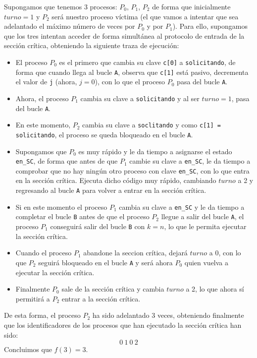 \begin{description}
        Supongamos que tenemos 3 procesos: $P_0$, $P_1$, $P_2$ de forma que inicialmente $turno = 1$ y $P_2$ será nuestro proceso víctima (el que vamos a intentar que sea adelantado el máximo número de veces por $P_0$ y por $P_1$). Para ello, supongamos que los tres intentan acceder de forma simultánea al protocolo de entrada de la sección crítica, obteniendo la siguiente traza de ejecución:
        \begin{itemize}
            \item El proceso $P_0$ es el primero que cambia su clave \verb|c[0]| a \verb|solicitando|, de forma que cuando llega al bucle \verb|A|, observa que \verb|c[1]| está pasivo, decrementa el valor de \verb|j| (ahora, $j=0$), con lo que el proceso $P_0$ pasa del bucle \verb|A|.
            \item Ahora, el proceso $P_1$ cambia su clave a \verb|solicitando| y al ser $turno = 1$, pasa del bucle \verb|A|.
            \item En este momento, $P_2$ cambia su clave a \verb|soclitando| y como \newline \verb|c[1] = solicitando|, el proceso se queda bloqueado en el bucle \verb|A|.
            \item Supongamos que $P_0$ es muy rápido y le da tiempo a asignarse el estado \verb|en_SC|, de forma que antes de que $P_1$ cambie su clave a \verb|en_SC|, le da tiempo a comprobar que no hay ningún otro proceso con clave \verb|en_SC|, con lo que entra en la sección crítica. Ejecuta dicho código muy rápido, cambiando $turno$ a 2 y regresando al bucle \verb|A| para volver a entrar en la sección crítica.
            \item Si en este momento el proceso $P_1$ cambia su clave a \verb|en_SC| y le da tiempo a completar el bucle \verb|B| antes de que el proceso $P_2$ llegue a salir del bucle \verb|A|, el proceso $P_1$ conseguirá salir del bucle \verb|B| con $k = n$, lo que le permita ejecutar la sección crítica.
            \item Cuando el proceso $P_1$ abandone la seccion crítica, dejará $turno$ a 0, con lo que $P_2$ seguirá bloqueado en el bucle \verb|A| y será ahora $P_0$ quien vuelva a ejecutar la sección crítica.
            \item Finalmente $P_0$ sale de la sección crítica y cambia $turno$ a 2, lo que ahora sí permitirá a $P_2$ entrar a la sección crítica.
        \end{itemize}
        De esta forma, el proceso $P_2$ ha sido adelantado 3 veces, obteniendo finalmente que los identificadores de los procesos que han ejecutado la sección crítica han sido:
        \begin{equation*}
            0\ 1\ 0\ 2
        \end{equation*}
        Concluimos que $f(3) = 3$.\\


\end{description}
